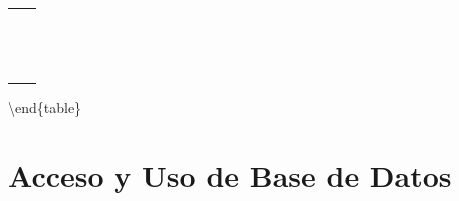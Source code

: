 \documentclass[
]{book}
\begin{document}
\begin{tabular}[t]{>{\raggedright\arraybackslash}p{4cm}>{\raggedleft\arraybackslash}p{4cm}}
\toprule
\cellcolor{white}{Variable} & \cellcolor{white}{2018-2019}\\
\midrule
\addlinespace[0.3em]
\multicolumn{2}{l}{\textbf{ }}\\
\hspace{1em}\cellcolor{white}{Hombre} & \cellcolor{white}{78.9}\\
\hspace{1em}\cellcolor{white}{Mujer} & \cellcolor{white}{86.1}\\
\addlinespace[0.3em]
\multicolumn{2}{l}{\textbf{ }}\\
\hspace{1em}\cellcolor{white}{Norte} & \cellcolor{white}{85.6}\\
\hspace{1em}\cellcolor{white}{Centro} & \cellcolor{white}{85.6}\\
\hspace{1em}\cellcolor{white}{Sur} & \cellcolor{white}{81.1}\\
\hspace{1em}\cellcolor{white}{Metropolitana} & \cellcolor{white}{79.5}\\
\addlinespace[0.3em]
\multicolumn{2}{l}{\textbf{ }}\\
\hspace{1em}\cellcolor{white}{18-29 años} & \cellcolor{white}{71.6}\\
\hspace{1em}\cellcolor{white}{30-49 años} & \cellcolor{white}{81.7}\\
\hspace{1em}\cellcolor{white}{50-64 años} & \cellcolor{white}{90.4}\\
\hspace{1em}\cellcolor{white}{65 años y más} & \cellcolor{white}{93.4}\\
\cellcolor{white}{Total} & \cellcolor{white}{83.2}\\
\bottomrule
\end{tabular}

\textbackslash end\{table\}

\hypertarget{acceso-y-uso-de-base-de-datos}{%
\chapter{Acceso y Uso de Base de Datos}\label{acceso-y-uso-de-base-de-datos}}
\end{document}
